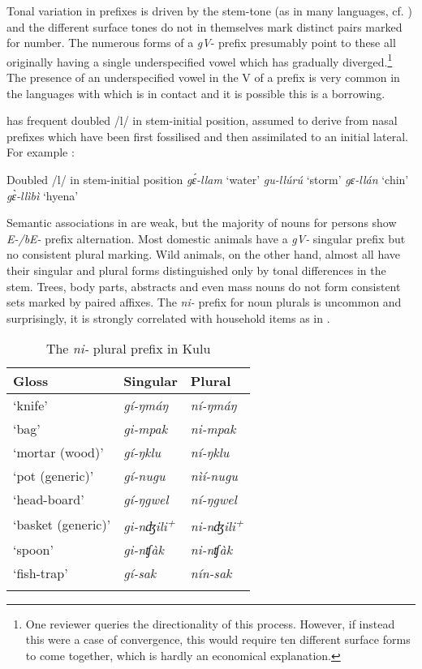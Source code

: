 \documentclass[output=paper]{langsci/langscibook}
\begin{document}
Tonal variation in prefixes is driven by the stem-tone (as in many  languages, cf. \citealt{Blench2000b}) and the different surface tones do not in themselves mark distinct pairs marked for number. The numerous forms of a \textit{gV}- prefix presumably point to these all originally having a single underspecified vowel which has gradually diverged.\footnote{One reviewer queries the directionality of this process. However, if instead this were a case of convergence, this would require ten different surface forms to come together, which is hardly an economical explanation.} The presence of an underspecified vowel in the V of a prefix is very common in the  languages with which  is in contact and it is possible this is a borrowing.

 has frequent doubled /l/ in stem-initial position, assumed to derive from nasal prefixes which have been first fossilised and then assimilated to an initial lateral. For example :

\ea\label{ex:nomaffplat:1}
\ea  Doubled /l/ in stem-initial position
\ex  \textit{gɛ́-llam}    ‘water’ 
\ex  \textit{gu-llúrú} ‘storm’ 
\ex \textit{gɛ-llán}    ‘chin’
\ex \textit{gɛ̀-llìbì}    ‘hyena’
\z
\z

Semantic associations in  are weak, but the majority of nouns for persons show \textit{E-/bE-} prefix alternation. Most domestic animals have a \textit{gV-} singular prefix but no consistent plural marking. Wild animals, on the other hand, almost all have their singular and plural forms distinguished only by tonal differences in the stem. Trees, body parts, abstracts and even mass nouns do not form consistent sets marked by paired affixes. The \textit{ni-} prefix for noun plurals is uncommon and surprisingly, it is strongly correlated with household items as in .

\begin{table}
\caption{The \textit{ni-} plural prefix in Kulu}
 \label{extab:nomaffplat:2}

\begin{tabularx}{\textwidth}{QQQ}
\lsptoprule
{{Gloss}} 	&{  Singular} 	& {Plural}\\
\midrule
{‘knife’} 	& \itshape gí-ŋmáŋ 	& \itshape ní-ŋmáŋ\\
{‘bag’}	& {\itshape gi-mpak} 	& \itshape ni-mpak\\
{‘mortar (wood)’}  	&{\itshape gí-ŋklu} 	& \itshape ní-ŋklu\\
{‘pot (generic)’} 	&{\itshape gí-nugu} 	& \itshape nìí-nugu\\
{‘head-board’}  	&{\itshape gí-ŋgwel} 	& \itshape ní-ŋgwel\\
{‘basket (generic)’}  	&{\textit{gi-nʤili\textsuperscript{+}}} 	& \textit{ni-nʤili\textsuperscript{+}}\\
{‘spoon’} 	&{\itshape gi-nʧàk} 	& \itshape ni-nʧàk\\
{‘fish-trap’} 	&{\itshape gí-sak} 	& \itshape nín-sak\\ 
\lspbottomrule
\end{tabularx} 
\end{table}
\end{document}
